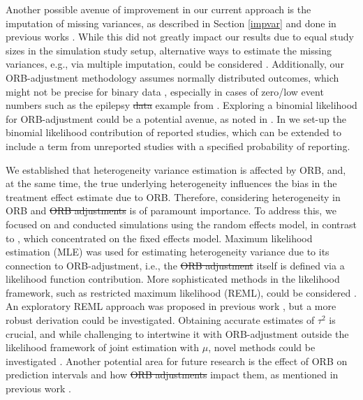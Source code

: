 \documentclass[twocolumn]{article}\usepackage[]{graphicx}\usepackage[]{xcolor}
\providecommand{\DIFaddtex}[1]{{\protect\color{blue}\uwave{#1}}} %
\providecommand{\DIFdeltex}[1]{{\protect\color{red}\sout{#1}}}                      %
\providecommand{\DIFaddbegin}{} %
\providecommand{\DIFaddend}{} %
\providecommand{\DIFdelbegin}{} %
\providecommand{\DIFdelend}{} %
\providecommand{\DIFadd}[1]{\texorpdfstring{\DIFaddtex{#1}}{#1}} %
\providecommand{\DIFdel}[1]{\texorpdfstring{\DIFdeltex{#1}}{}} %
\newcommand{\DIFscaledelfig}{0.5}
\newlength{\DIFdelgraphicswidth} %
\newlength{\DIFdelgraphicsheight} %
\newcommand{\DIFaddincludegraphics}[2][]{{\color{blue}\fbox{\DIFOincludegraphics[#1]{#2}}}} %
\newcommand{\DIFdelincludegraphics}[2][]{%
\sbox{\DIFdelgraphicsbox}{\DIFOincludegraphics[#1]{#2}}%
\settoboxwidth{\DIFdelgraphicswidth}{\DIFdelgraphicsbox} %
\settoboxtotalheight{\DIFdelgraphicsheight}{\DIFdelgraphicsbox} %
\scalebox{\DIFscaledelfig}{%
\parbox[b]{\DIFdelgraphicswidth}{\usebox{\DIFdelgraphicsbox}\\[-\baselineskip] \rule{\DIFdelgraphicswidth}{0em}}\llap{\resizebox{\DIFdelgraphicswidth}{\DIFdelgraphicsheight}{%
\setlength{\unitlength}{\DIFdelgraphicswidth}%
\begin{picture}(1,1)%
\thicklines\linethickness{2pt} %
{\color[rgb]{1,0,0}\put(0,0){\framebox(1,1){}}}%
{\color[rgb]{1,0,0}\put(0,0){\line( 1,1){1}}}%
{\color[rgb]{1,0,0}\put(0,1){\line(1,-1){1}}}%
\end{picture}%
}\hspace*{3pt}}} %
} %
\DeclareRobustCommand{\DIFaddbegin}{\DIFOaddbegin \let\includegraphics\DIFaddincludegraphics} %
\DeclareRobustCommand{\DIFaddend}{\DIFOaddend \let\includegraphics\DIFOincludegraphics} %
\DeclareRobustCommand{\DIFdelbegin}{\DIFOdelbegin \let\includegraphics\DIFdelincludegraphics} %
\DeclareRobustCommand{\DIFdelend}{\DIFOaddend \let\includegraphics\DIFOincludegraphics} %
\begin{document}
\DIFaddend Another possible avenue of improvement in our current approach is the imputation of missing variances, as described in Section \ref{impvar} and done in previous works \citep{Copas2014, Copas2019, Bay, mythesis}. While this did not greatly impact our results due to equal study sizes in the simulation study setup, alternative ways to estimate the missing variances, e.g., via multiple imputation, could be considered \citep{var_imp, var_imp2}. Additionally, our ORB-adjustment methodology assumes normally distributed outcomes, which might not be precise for binary data \citep{Copas2014, Copas2019}, especially in cases of zero/low event numbers such as the epilepsy \DIFdelbegin \DIFdel{data }\DIFdelend example from \citet{Copas2019}. Exploring a binomial likelihood for ORB-adjustment could be a potential avenue, as noted in \citet{mythesis}. In \citet{mythesis} we set-up the binomial likelihood contribution of reported studies, which can be extended to include a term from unreported studies with a specified probability of reporting.

We established that heterogeneity variance estimation is affected by ORB, and, at the same time, the true underlying heterogeneity influences the bias in the treatment effect estimate due to ORB. Therefore, considering heterogeneity in ORB and \DIFdelbegin \DIFdel{ORB adjustments }\DIFdelend \DIFaddbegin \DIFadd{ORB-adjustments }\DIFaddend is of paramount importance. To address this, we focused on and conducted simulations using the random effects model, in contrast to \citet{Copas2019}, which concentrated on the fixed effects model. Maximum likelihood estimation (MLE) was used for estimating heterogeneity variance due to its connection to ORB-adjustment, i.e.,  the \DIFdelbegin \DIFdel{ORB adjustment }\DIFdelend \DIFaddbegin \DIFadd{ORB-adjustment }\DIFaddend itself is defined via a likelihood function contribution. More sophisticated methods in the likelihood framework, such as restricted maximum likelihood (REML), could be considered \citep{REML, tauCI, REML2, mythesis}. An exploratory REML approach was proposed in previous work \citep{mythesis}, but a more robust derivation could be investigated. Obtaining accurate estimates of $\tau^2$ is crucial, and while challenging to intertwine it with ORB-adjustment outside the likelihood framework of joint estimation with $\mu$, novel methods could be investigated \citep{tauCI, REML, REML2}. Another potential area for future research is the effect of ORB on prediction intervals \citep{PI_coverage} and how \DIFdelbegin \DIFdel{ORB adjustments }\DIFdelend \DIFaddbegin \DIFadd{ORB-adjustments }\DIFaddend impact them, as mentioned in previous work \citep{mythesis}.
\end{document}
